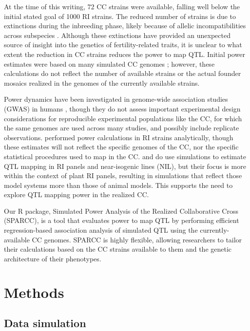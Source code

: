 At the time of this writing, 72 CC strains were available, falling well below the initial stated goal of 1000 RI strains. The reduced number of strains is due to extinctions during the inbreeding phase, likely because of allelic incompatibilities across subspecies \citep{Shorter2017}. Although these extinctions have provided an unexpected source of insight into the genetics of fertility-related traits, it is unclear to what extent the reduction in CC strains reduces the power to map QTL. Initial power estimates were based on many simulated CC genomes \citep{Valdar2006a}; however, these calculations do not reflect the number of available strains or the actual founder mosaics realized in the genomes of the currently available strains. 

Power dynamics have been investigated in genome-wide association studies (GWAS) in humans \citep{Purcell2003,Klein2007}, though they do not assess important experimental design considerations for reproducible experimental populations like the CC, for which the same genomes are used across many studies, and possibly include replicate observations. \cite{Kaeppler1997} performed power calculations in RI strains analytically, though these estimates will not reflect the specific genomes of the CC, nor the specific statistical procedures used to map in the CC. \cite{Falke2011} and \cite{Takuno2012} do use simulations to estimate QTL mapping in RI panels and near-isogenic lines (NIL), but their focus is more within the context of plant RI panels, resulting in simulations that reflect those model systems more than those of animal models. This supports the need to explore QTL mapping power in the realized CC.

Our R package, Simulated Power Analysis of the Realized Collaborative Cross (SPARCC), is a tool that evaluates power to map QTL by performing efficient regression-based association analysis of simulated QTL using the currently-available CC genomes. SPARCC is highly flexible, allowing researchers to tailor their calculations based on the CC strains available to them and the genetic architecture of their phenotypes.

\section{Methods}

\subsection{Data simulation}

